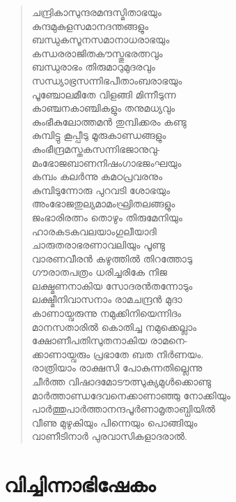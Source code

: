 \begin{verse}
ചന്ദ്രികാസുന്ദരമന്ദസ്മിതാഭയും\\
കുന്ദമുകുളസമാനദന്തങ്ങളും\\
ബന്ധുകസൂനസമാനാധരാഭയും\\
കന്ധരരാജിതകൗസ്തുഭരത്നവും\\
ബന്ധുരാഭം തിരുമാറുമുദരവും\\
സന്ധ്യാഭ്രസന്നിഭപീതാംബരാഭയും\\
പൂഞ്ചോലമീതേ വിളങ്ങി മിന്നീടുന്ന\\
കാഞ്ചനകാഞ്ചികളും തനുമധ്യവും\\
കുംഭീകുലോത്തമന്‍ തുമ്പിക്കരം കണ്ടു\\
കുമ്പിട്ടു കൂപ്പീടു മൂരുകാണ്ഡങ്ങളും\\
കുംഭീന്ദ്രമസ്തകസന്നിഭജാനുവു-\\
മംഭോജബാണനിഷംഗാഭജംഘയും\\
കമ്പം കലര്‍ന്നു കമഠപ്രവരനും\\
കുമ്പിടുന്നോരു പുറവടി ശോഭയും\\
അംഭോജതുല്യമാമംഘ്രിതലങ്ങളും\\
ജംഭാരിരത്നം തൊഴും തിരുമേനിയും\\
ഹാരകടകവലയാംഗുലീയാദി\\
ചാരുതരാഭരണാവലിയും പൂണ്ടു\\
വാരണവീരന്‍ കഴുത്തില്‍ തിറത്തോടു\\
ഗൗരാതപത്രം ധരിച്ചരികേ നിജ\\
ലക്ഷ്മണനാകിയ സോദരന്‍തന്നോടും\\
ലക്ഷ്മീനിവാസനാം രാമചന്ദ്രന്‍ മുദാ\\
കാണായ്വരുന്നു നമുക്കിനിയെന്നിദം\\
മാനസതാരില്‍ കൊതിച്ച നമുക്കെല്ലാം\\
ക്ഷോണീപതിസുതനാകിയ രാമനെ-\\
ക്കാണായ്വരും പ്രഭാതേ ബത നിര്‍ണയം.\\
രാത്രിയാം രാക്ഷസി പോകുന്നതില്ലെന്നു\\
ചീര്‍ത്ത വിഷാദമോടൗത്സുക്യമുള്‍ക്കൊണ്ടു\\
മാര്‍ത്താണ്ഡദേവനെക്കാണാഞ്ഞു നോക്കിയും\\
പാര്‍ത്തുപാര്‍ത്താനന്ദപൂര്‍ണാമൃതാബ്ധിയില്‍\\
വീണു മുഴുകിയും പിന്നെയും പൊങ്ങിയും\\
വാണീടിനാര്‍ പുരവാസികളാദരാല്‍.
\end{verse}


\section{വിച്ചിന്നാഭിഷേകം}

